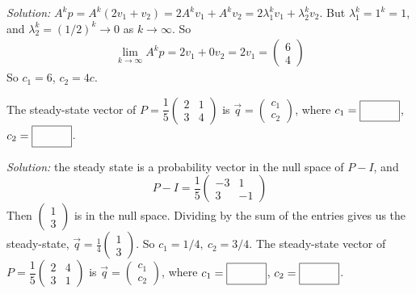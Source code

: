 \begin{parts}
        \ifnum {} {\color{DarkBlue} \textit{Solution:} $A^kp = A^k(2v_1 + v_2) = 2A^kv_1 + A^kv_2 = 2\lambda_1^kv_1 + \lambda_2^kv_2$. But $\lambda_1^k =1^k = 1$, and $\lambda_2^k = (1/2)^k\to 0$ as $k\to \infty$. So \begin{align}
            \lim_{k \to \infty} A^kp = 2v_1 + 0v_2 = 2v_1 = \begin{pmatrix} 6\\4\end{pmatrix}
        \end{align} So $c_1 = 6$, $c_2 = 4c$. } \fi    
    
    \fi    
    \ifnum {}
        The steady-state vector of $P=\dfrac15\begin{pmatrix} 2&1\\3&4\end{pmatrix}$ is $\vec q = \begin{pmatrix} c_1 \\c_2 \end{pmatrix}$, where $c_1 = \framebox{\strut\hspace{1cm}}$, $c_2 = \framebox{\strut\hspace{1cm}}$.
        
        \ifnum {} {\color{DarkBlue} \textit{Solution:} the steady state is a probability vector in the null space of $P-I$, and $$P-I = \dfrac15\begin{pmatrix} -3&1\\3&-1 \end{pmatrix} $$ Then $\begin{pmatrix} 1\\3\end{pmatrix}$ is in the null space. Dividing by the sum of the entries gives us the steady-state, $\vec q = \frac14\begin{pmatrix} 1\\3\end{pmatrix}$. So $c_1 = 1/4, \ c_2 = 3/4$. } \fi
    \fi    
    \ifnum {}
        The steady-state vector of $P=\dfrac15\begin{pmatrix} 2&4\\3&1\end{pmatrix}$ is $\vec q = \begin{pmatrix} c_1 \\c_2 \end{pmatrix}$, where $c_1 = \framebox{\strut\hspace{1cm}}$, $c_2 = \framebox{\strut\hspace{1cm}}$.
        

\end{parts}
